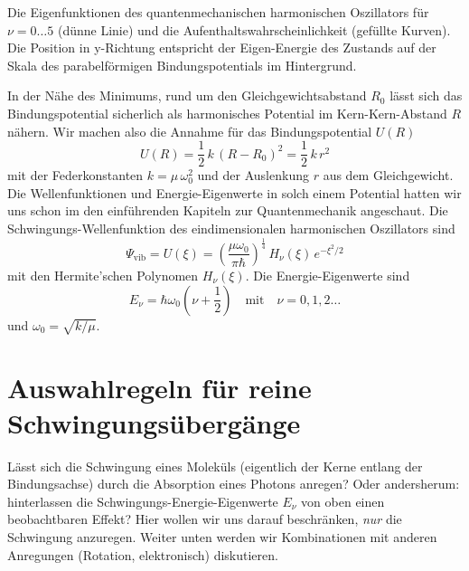\begin{marginfigure}
\caption{Die Eigenfunktionen des quantenmechanischen harmonischen Oszillators für $\nu = 0 \dots 5$ (dünne Linie) und die Aufenthaltswahrscheinlichkeit (gefüllte Kurven). Die Position in y-Richtung entspricht der Eigen-Energie des Zustands auf der Skala des parabelförmigen Bindungspotentials im Hintergrund.
\label{fig:vib_1d_WF}}
\end{marginfigure}

In der Nähe des Minimums, rund um den Gleichgewichtsabstand $R_0$ lässt sich das Bindungspotential sicherlich als harmonisches Potential im Kern-Kern-Abstand $R$ nähern. Wir machen also die Annahme für das Bindungspotential $U(R)$
\begin{equation}
U(R)  = \frac{1}{2} \, k \, (R - R_0 )^2 = \frac{1}{2} \, k \, r^2 
\end{equation}
mit der Federkonstanten $k = \mu \, \omega_0^2$ und der Auslenkung $r$ aus dem Gleichgewicht. Die Wellenfunktionen und Energie-Eigenwerte in solch einem Potential hatten wir uns schon im den einführenden Kapiteln zur Quantenmechanik angeschaut.
Die Schwingungs-Wellenfunktion des eindimensionalen harmonischen Oszillators sind
\begin{equation}
\Psi_\text{vib} =  U(\xi) = \left(\frac{\mu \omega_0}{\pi \hbar} \right)^{\frac{1}{4}} \,
 H_\nu(\xi) \, e^{- \xi^2 /2}
\end{equation}
mit den Hermite'schen Polynomen $H_\nu(\xi)$.
Die Energie-Eigenwerte sind
\begin{equation}
E_\nu = \hbar \omega_0 \left(\nu + \frac{1}{2} \right) \quad \text{mit} \quad \nu = 0, 1, 2 \dots
\end{equation}
und $\omega_0 = \sqrt{k / \mu}$.



\section{Auswahlregeln für reine Schwingungsübergänge}

Lässt sich die Schwingung eines Moleküls (eigentlich der Kerne entlang der Bindungsachse) durch die Absorption eines Photons anregen? Oder andersherum: hinterlassen die Schwingungs-Energie-Eigenwerte $E_\nu$ von oben einen beobachtbaren Effekt? Hier wollen wir uns darauf beschränken, \emph{nur} die Schwingung anzuregen. Weiter unten werden wir Kombinationen mit anderen Anregungen (Rotation, elektronisch) diskutieren.

